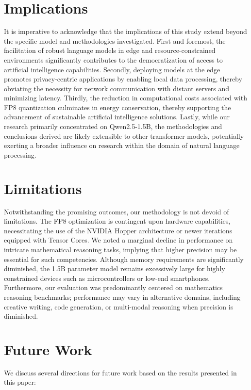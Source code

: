 \section*{Implications}

It is imperative to acknowledge that the implications of this study extend beyond the specific model and methodologies investigated. First and foremost, the facilitation of robust language models in edge and resource-constrained environments significantly contributes to the democratization of access to artificial intelligence capabilities. Secondly, deploying models at the edge promotes privacy-centric applications by enabling local data processing, thereby obviating the necessity for network communication with distant servers and minimizing latency. Thirdly, the reduction in computational costs associated with FP8 quantization culminates in energy conservation, thereby supporting the advancement of sustainable artificial intelligence solutions. Lastly, while our research primarily concentrated on Qwen2.5-1.5B, the methodologies and conclusions derived are likely extensible to other transformer models, potentially exerting a broader influence on research within the domain of natural language processing.

\section*{Limitations}

Notwithstanding the promising outcomes, our methodology is not devoid of limitations. The FP8 optimization is contingent upon hardware capabilities, necessitating the use of the NVIDIA Hopper architecture or newer iterations equipped with Tensor Cores. We noted a marginal decline in performance on intricate mathematical reasoning tasks, implying that higher precision may be essential for such competencies. Although memory requirements are significantly diminished, the 1.5B parameter model remains excessively large for highly constrained devices such as microcontrollers or low-end smartphones. Furthermore, our evaluation was predominantly centered on mathematics reasoning benchmarks; performance may vary in alternative domains, including creative writing, code generation, or multi-modal reasoning when precision is diminished.
\section*{Future Work}

We discuss several directions for future work based on the results presented in this paper:\\

